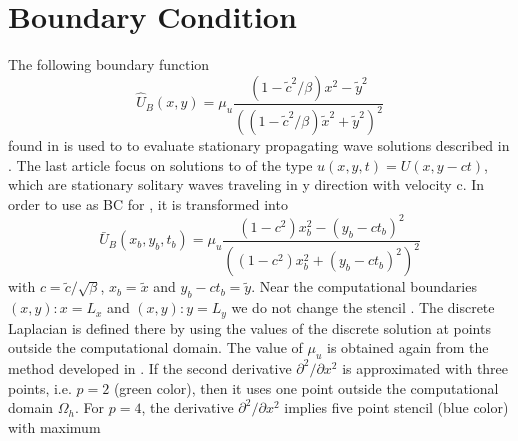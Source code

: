 \documentclass[11pt,a4paper,twoside]{article}
\begin{document}
\section{Boundary Condition}\label{BndS}
The following boundary function
\begin{equation}\label{eqBCV}
\widehat U_B(x , y) = \mu_u \frac{ (1 - \tilde c^2/\beta) x^2 - \tilde y^2}{( (1 - \tilde c^2/\beta) \tilde x^2 + \tilde y^2)^2}
\end{equation}
found in \cite{BoundaryProblem} is used to to evaluate stationary propagating wave solutions described in \cite{EllipticProblem}. The last article focus on solutions to  of the type $u(x, y, t) = U(x, y - ct)$, which are stationary solitary waves traveling in y direction
with velocity c. In order to use  as BC for , it is transformed into
\begin{equation}\label{eqBCH}
\bar U_B(x_b , y_b, t_b) = \mu_u \frac{ (1 - c^2) x_b^2 - (y_b-ct_b)^2}{( (1 - c^2) x_b^2 + (y_b-ct_b)^2)^2}
\end{equation}
with $c = \tilde c / \sqrt{\beta}$, $x_b = \tilde x$ and $y_b - ct_b = \tilde y$. 
Near the computational boundaries $(x,y):x=L_x$ and $(x,y):y=L_y$ we do not change the stencil . The discrete Laplacian
is defined there by using the values of the discrete solution  at points outside the computational domain. The value of $\mu_u$ is obtained again from the method developed in \cite{BoundaryProblem}. If the second derivative $\partial^2 / \partial x^2$ is approximated with three points, i.e. $p=2$ (green color), then it uses one point outside the computational domain $\Omega_h$. For $p=4$, the derivative $\partial^2 / \partial x^2$ implies five point stencil (blue color) with maximum
\end{document}
